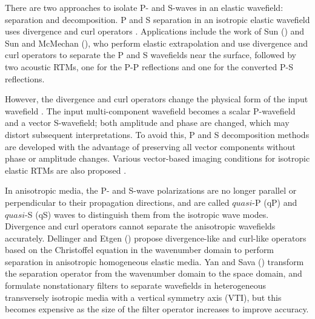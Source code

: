 \documentclass[manuscript,ulem,graphix,revised]{geophysics}
\begin{document}
There are two approaches to isolate P- and S-waves in an elastic wavefield: separation and decomposition. P and S separation in an isotropic elastic wavefield uses divergence and curl operators \citep{morse53,clayton81,mora87}. Applications include the work of Sun (\citeyear{sun99}) and Sun and McMechan (\citeyear{sun01}), who perform elastic extrapolation and use divergence and curl operators to separate the P and S wavefields near the surface, followed by two acoustic RTMs, one for the P-P reflections and one for the converted P-S reflections. 

However, the divergence and curl operators change the physical form of the input wavefield \citep{wenlong_ps15}. The input multi-component wavefield becomes a scalar P-wavefield and a vector S-wavefield; both amplitude and phase are changed, which may distort subsequent interpretations. To avoid this, P and S decomposition methods 
\citep{ma03,zhang07,xiao10,zhang10,wenlong_ps15,wenlong_vsc15}
are developed with the advantage of preserving all vector components without phase or amplitude changes. Various vector-based imaging conditions for isotropic elastic RTMs are also proposed \citep{wenlong_vct15,wenlong_vct16,wang16}.


In anisotropic media, the P- and S-wave polarizations are no longer parallel or perpendicular to their propagation directions, and are called $quasi$-P (qP) and $quasi$-S (qS) waves to distinguish them from the isotropic wave modes. Divergence and curl operators cannot separate the anisotropic wavefields accurately.
Dellinger and Etgen (\citeyear{dellinger90}) propose divergence-like and curl-like operators based on the Christoffel equation in the wavenumber domain to perform separation in anisotropic homogeneous elastic media. Yan and Sava (\citeyear{yan08}) transform the separation operator from the wavenumber domain to the space domain, and formulate nonstationary filters to separate wavefields in heterogeneous transversely isotropic media with a vertical symmetry axis (VTI), but this becomes expensive as the size of the filter operator increases to improve accuracy. 
\end{document}
